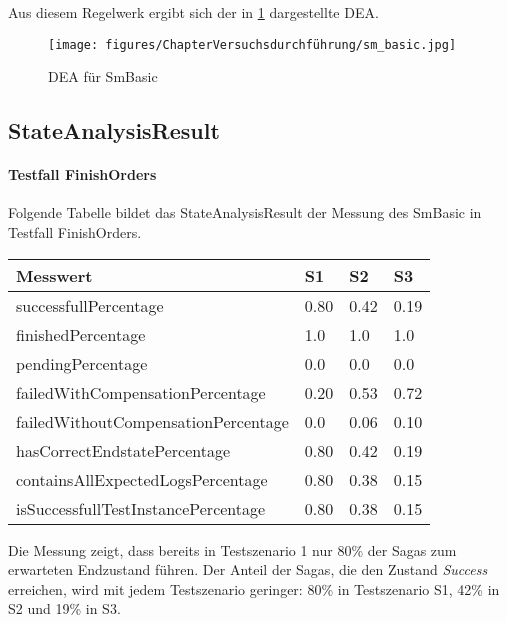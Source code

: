 Aus diesem Regelwerk ergibt sich der in \cref{fig:fig_sm_basic} dargestellte DEA. 

\begin{figure}[H]
	\centering
	\texttt{[image: figures/ChapterVersuchsdurchführung/sm\_basic.jpg]}
	\caption{DEA für SmBasic}
	\label{fig:fig_sm_basic}
\end{figure}
\FloatBarrier

\subsection{StateAnalysisResult}

\paragraph*{Testfall FinishOrders}
Folgende Tabelle bildet das StateAnalysisResult der Messung des SmBasic in Testfall FinishOrders.

\begin{center}
	\fontsize{9}{12}\selectfont
	\begin{longtable}[h]{|p{5cm}|p{1cm}|p{1cm}|p{1cm}|}
		\hline
		Messwert & S1 & S2 & S3 \\ \hline
		\endhead
		\endfoot
		successfull\-Percentage & 0.80 & 0.42 & 0.19 \\ \hline
		finished\-Percentage & 1.0 & 1.0 & 1.0 \\ \hline
		pending\-Percentage & 0.0 & 0.0 & 0.0 \\ \hline
		failedWithCompensation\-Percentage & 0.20 & 0.53 & 0.72 \\ \hline
		failedWithoutCompensation\-Percentage & 0.0 & 0.06 & 0.10 \\ \hline
		hasCorrectEndstate\-Percentage & 0.80 & 0.42 & 0.19 \\ \hline
		containsAllExpectedLogs\-Percentage & 0.80 & 0.38 & 0.15 \\ \hline
		isSuccessfullTestInstance\-Percentage & 0.80 & 0.38 & 0.15 \\ \hline
	\end{longtable}
\end{center}
\FloatBarrier

Die Messung zeigt, dass bereits in Testszenario 1 nur 80\% der Sagas zum erwarteten Endzustand führen. Der Anteil der Sagas, die den Zustand \textit{Success} erreichen, wird mit jedem Testszenario geringer: 80\% in Testszenario S1, 42\% in S2 und 19\% in S3.


